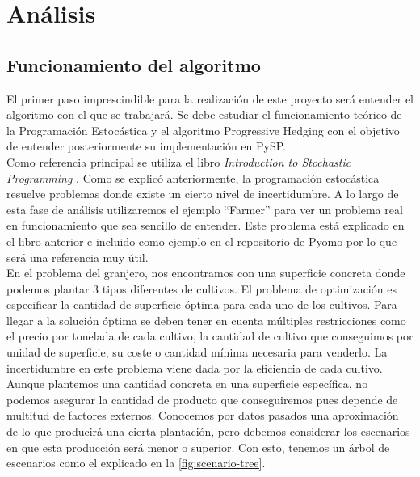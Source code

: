 \chapter{Análisis}

\section{Funcionamiento del algoritmo}


El primer paso imprescindible para la realización de este proyecto será entender el algoritmo con el que se trabajará. Se debe estudiar el funcionamiento teórico de la Programación Estocástica y el algoritmo Progressive Hedging con el objetivo de entender posteriormente su implementación en PySP. \\

Como referencia principal se utiliza el libro {\it Introduction to Stochastic Programming} \cite{stochasticProgramming}. Como se explicó anteriormente, la programación estocástica resuelve problemas donde existe un cierto nivel de incertidumbre. A lo largo de esta fase de análisis utilizaremos el ejemplo ``Farmer'' para ver un problema real en funcionamiento que sea sencillo de entender. Este problema está explicado en el libro anterior e incluido como ejemplo en el repositorio de Pyomo por lo que será una referencia muy útil.\\

En el problema del granjero, nos encontramos con una superficie concreta donde podemos plantar 3 tipos diferentes de cultivos. El problema de optimización es especificar la cantidad de superficie óptima para cada uno de los cultivos. Para llegar a la solución óptima se deben tener en cuenta múltiples restricciones como el precio por tonelada de cada cultivo, la cantidad de cultivo que conseguimos por unidad de superficie, su coste o cantidad mínima necesaria para venderlo. La incertidumbre en este problema viene dada por la eficiencia de cada cultivo. Aunque plantemos una cantidad concreta en una superficie específica, no podemos asegurar la cantidad de producto que conseguiremos pues depende de multitud de factores externos. Conocemos por datos pasados una aproximación de lo que producirá una cierta plantación, pero debemos considerar los escenarios en que esta producción será menor o superior. Con esto, tenemos un árbol de escenarios como el explicado en la \autoref{fig:scenario-tree}.\\

